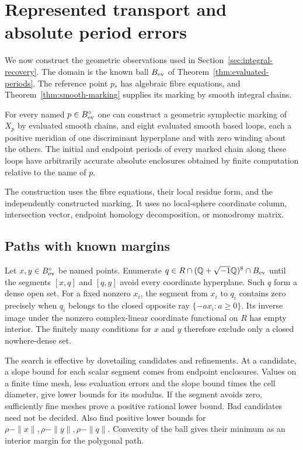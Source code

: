 \section{Represented transport and absolute period errors}
\label{sec:transport}

We now construct the geometric observations used in
Section~\ref{sec:integral-recovery}. The domain is the known ball
$B_{\rm ev}$ of Theorem~\ref{thm:evaluated-periods}. The reference
point $p_*$ has algebraic fibre equations, and
Theorem~\ref{thm:smooth-marking} supplies its marking by smooth
integral chains.

\begin{theorem}\label{thm:accessible-observations}
For every named $p\in B_{\rm ev}^{\circ}$ one can construct a
geometric symplectic marking of $X_p$ by evaluated smooth chains,
and eight evaluated smooth based loops, each a positive meridian
of one discriminant hyperplane and with zero winding about the others.
The initial and endpoint periods of every marked chain along these
loops have arbitrarily accurate absolute enclosures obtained by
finite computation relative to the name of $p$.

The construction uses the fibre equations, their local residue form,
and the independently constructed marking. It uses no local-sphere
coordinate column, intersection vector, endpoint homology
decomposition, or monodromy matrix.
\end{theorem}

\subsection{Paths with known margins}

Let $x,y\in B_{\rm ev}^{\circ}$ be named points. Enumerate
$q\in R\cap(\mathbb Q+\sqrt{-1}\mathbb Q)^8\cap B_{\rm ev}$ until the
segments $[x,q]$ and $[q,y]$ avoid every coordinate hyperplane.
Such $q$ form a dense open set. For a fixed nonzero $x_i$, the
segment from $x_i$ to $q_i$ contains zero precisely when $q_i$
belongs to the closed opposite ray $\{-a x_i:a\ge0\}$. Its inverse
image under the nonzero complex-linear coordinate functional on
$R$ has empty interior. The finitely many conditions for $x$ and
$y$ therefore exclude only a closed nowhere-dense set.

The search is effective by dovetailing candidates and refinements.
At a candidate, a slope bound for each scalar segment comes from
endpoint enclosures. Values on a finite time mesh, less evaluation
errors and the slope bound times the cell diameter, give lower
bounds for its modulus. If the segment avoids zero, sufficiently
fine meshes prove a positive rational lower bound. Bad candidates
need not be decided. Also find positive lower bounds for
$\rho-\|x\|,\rho-\|y\|,\rho-\|q\|$. Convexity of the ball gives
their minimum as an interior margin for the polygonal path.


